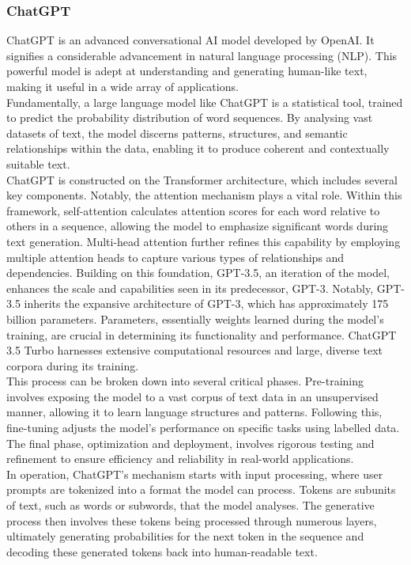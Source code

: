 \subsubsection*{ChatGPT}\label{sec:chatgpt}
ChatGPT is an advanced conversational AI model developed by OpenAI. It signifies a considerable advancement in natural language processing (NLP). This powerful model is adept at understanding and generating human-like text, making it useful in a wide array of applications.\\
Fundamentally, a large language model like ChatGPT is a statistical tool, trained to predict the probability distribution of word sequences. By analysing vast datasets of text, the model discerns patterns, structures, and semantic relationships within the data, enabling it to produce coherent and contextually suitable text.\\  
ChatGPT is constructed on the Transformer architecture, which includes several key components. Notably, the attention mechanism plays a vital role. Within this framework, self-attention calculates attention scores for each word relative to others in a sequence, allowing the model to emphasize significant words during text generation. Multi-head attention further refines this capability by employing multiple attention heads to capture various types of relationships and dependencies.  Building on this foundation, GPT-3.5, an iteration of the model, enhances the scale and capabilities seen in its predecessor, GPT-3. Notably, GPT-3.5 inherits the expansive architecture of GPT-3, which has approximately 175 billion parameters. Parameters, essentially weights learned during the model's training, are crucial in determining its functionality and performance.  ChatGPT 3.5 Turbo harnesses extensive computational resources and large, diverse text corpora during its training.\\
This process can be broken down into several critical phases. Pre-training involves exposing the model to a vast corpus of text data in an unsupervised manner, allowing it to learn language structures and patterns. Following this, fine-tuning adjusts the model's performance on specific tasks using labelled data. The final phase, optimization and deployment, involves rigorous testing and refinement to ensure efficiency and reliability in real-world applications.\\
In operation, ChatGPT's mechanism starts with input processing, where user prompts are tokenized into a format the model can process. Tokens are subunits of text, such as words or subwords, that the model analyses. The generative process then involves these tokens being processed through numerous layers, ultimately generating probabilities for the next token in the sequence and decoding these generated tokens back into human-readable text.


